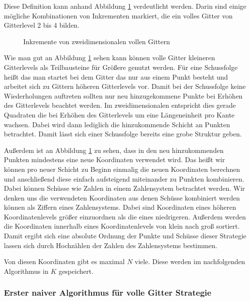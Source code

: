 \documentclass[a4paper,12pt]{llncs}
\numberwithin{equation}{section}
\begin{document}
Diese Definition kann anhand Abbildung \ref{fig:gitter02} verdeutlicht werden. Darin sind einige mögliche Kombinationen von Inkrementen markiert, die ein volles Gitter von Gitterlevel 2 bis 4 bilden.

\begin{figure}
	\caption{Inkremente von zweidimensionalen vollen Gittern}
	\label{fig:gitter02}
\end{figure}

Wie man gut an Abbildung \ref{fig:gitter02} sehen kann können volle Gitter kleineren Gitterlevels als Teilbausteine für Größere genutzt werden. Für eine Schussfolge heißt das man startet bei dem Gitter das nur aus einem Punkt besteht und arbeitet sich zu Gittern höheren Gitterlevels vor. Damit bei der Schussfolge keine Wiederholungen auftreten sollten nur neu hinzugekommene Punkte bei Erhöhen des Gitterlevels beachtet werden. Im zweidimensionalen entspricht dies gerade Quadraten die bei Erhöhen des Gitterlevels um eine Längeneinheit pro Kante wachsen. Dabei wird dann lediglich die hinzukommende Schicht an Punkten betrachtet. Damit lässt sich einer Schussfolge bereits eine grobe Struktur geben. 

Außerdem ist an Abbildung \ref{fig:gitter02} zu sehen, dass in den neu hinzukommenden Punkten mindestens eine neue Koordinaten verwendet wird. Das heißt wir können pro neuer Schicht zu Beginn einmalig die neuen Koordinaten berechnen und anschließend diese einfach aufsteigend miteinander zu Punkten kombinieren. Dabei können Schüsse wie Zahlen in einem Zahlensystem betrachtet werden. Wir denken uns die verwendeten Koordinaten aus denen Schüsse kombiniert werden können als Ziffern eines Zahlensystems. Dabei sind Koordinaten eines höheren Koordinatenlevels größer einzuordnen als die eines niedrigeren. Außerdem werden die Koordinaten innerhalb eines Koordinatenlevels von klein nach groß sortiert. Damit ergibt sich eine absolute Ordnung der Punkte und Schüsse dieser Strategie lassen sich durch Hochzählen der Zahlen des Zahlensystems bestimmen.

Von diesen Koordinaten gibt es maximal $N$ viele. Diese werden im nachfolgenden Algorithmus in $K$ gespeichert.

\subsubsection{Erster naiver Algorithmus für volle Gitter Strategie}
\end{document}
